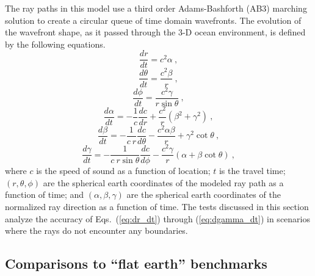 \documentclass{ws-jca}
\begin{document}
The ray paths in this model use a third order Adams-Bashforth (AB3)
marching solution\cite{Yakowitz1986} to create a circular queue of time
domain wavefronts. The evolution of the wavefront shape, as it passed
through the 3-D ocean environment, is defined by the following equations.
\begin{equation}
	\frac{dr}{dt} = c^2 \alpha \:,
	\label{eq:dr_dt}
\end{equation}
\begin{equation}
	\frac{d\theta}{dt} = \frac{c^2 \beta}{r} \:,
	\label{eq:dtheta_dt}
\end{equation}
\begin{equation}
	\frac{d\phi}{dt} = \frac{c^2\gamma}{r \sin{\theta}} \:,
	\label{eq:dphi_dt}
\end{equation}
\begin{equation}
	\frac{d\alpha}{dt} = -\frac{1}{c}\frac{dc}{dr} 
		+ \frac{c^2}{r}\left( \beta^2 + \gamma^2 \right) \:,
	\label{eq:dalpha_dt}
\end{equation}
\begin{equation}
	\frac{d\beta}{dt} = -\frac{1}{c \: r}\frac{dc}{d\theta} 
		- \frac{c^2 \alpha \beta}{r} + \gamma^2 \cot{\theta} \:,
	\label{eq:dbeta_dt}
\end{equation}
\begin{equation}
	\frac{d\gamma}{dt} = -\frac{1}{c \: r \sin{\theta}}\frac{dc}{d\phi} 
		- \frac{c^2 \gamma}{r} \left( \alpha + \beta \cot{\theta} \right) \:,
	\label{eq:dgamma_dt}
\end{equation}
where 
$c$ is the speed of sound as a function of location;
$t$ is the travel time;
\((r, \theta, \phi)\) are the spherical earth coordinates of the modeled ray 
path as a function of time; and
\((\alpha, \beta, \gamma)\) are the spherical earth coordinates of the 
normalized ray direction as a function of time.
The tests discussed in this section analyze the accuracy of
Eqs.~(\ref{eq:dr_dt}) through (\ref{eq:dgamma_dt}) in scenarios where the
rays do not encounter any boundaries.

\subsection{Comparisons to ``flat earth'' benchmarks}
\end{document}
